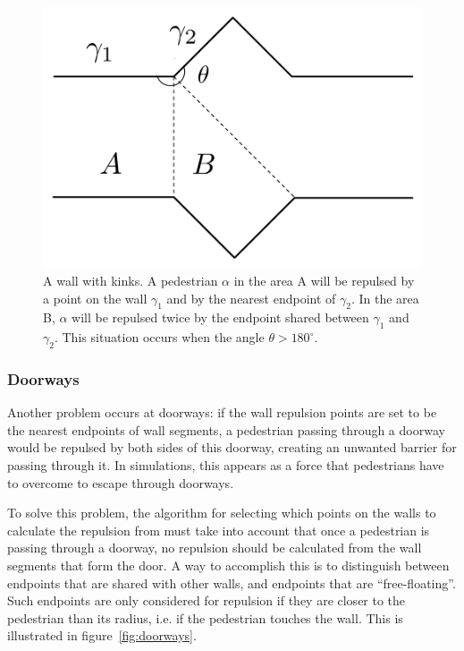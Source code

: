 \begin{figure}[h]
    \centering
    \includegraphics[scale=0.45]{Figures/WallCase.pdf} \caption[A wall with 
    kinks]{A wall with kinks. A pedestrian $\alpha$ in the area A will be 
    repulsed by a point on the wall $\gamma_1$ and by the nearest endpoint of 
    $\gamma_2$. In the area B, $\alpha$ will be repulsed twice by the endpoint 
    shared between $\gamma_1$ and $\gamma_2$. This situation occurs when the 
    angle $\theta > 180^\circ$.}
    \label{fig:wall-kinks}
\end{figure}

\subsubsection{Doorways}
Another problem occurs at doorways: if the wall repulsion points are set to be 
the nearest endpoints of wall segments, a pedestrian passing through a doorway 
would be repulsed by both sides of this doorway, creating an unwanted barrier 
for passing through it. In simulations, this appears as a force 
that pedestrians have to overcome to escape through doorways.

To solve this problem, the algorithm for selecting which points on the walls 
to calculate the repulsion from must take into account that once a pedestrian 
is passing through a doorway, no repulsion should be calculated from the wall 
segments that form the door. A way to accomplish this is to distinguish 
between endpoints that are shared with other walls, and endpoints that are 
``free-floating''. Such endpoints are only considered for repulsion if they 
are closer to the pedestrian than its radius, i.e. if the pedestrian touches 
the wall. This is illustrated in figure~\ref{fig:doorways}.

